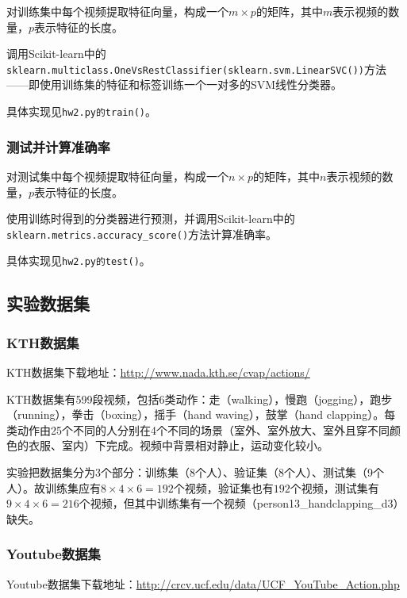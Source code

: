 \documentclass[a4paper, 12pt, UTF8]{article}
\begin{document}
对训练集中每个视频提取特征向量，构成一个$m \times p$的矩阵，其中$m$表示视频的数量，$p$表示特征的长度。

调用Scikit-learn中的\lstinline[language=Python]{sklearn.multiclass.OneVsRestClassifier(sklearn.svm.LinearSVC())}方法\textsuperscript{\cite{ref3} \cite{ref4}}——即使用训练集的特征和标签训练一个一对多的SVM线性分类器。

具体实现见\lstinline{hw2.py的train()}。

\subsubsection{测试并计算准确率}

对测试集中每个视频提取特征向量，构成一个$n \times p$的矩阵，其中$n$表示视频的数量，$p$表示特征的长度。

使用训练时得到的分类器进行预测，并调用Scikit-learn中的\lstinline[language=Python]{sklearn.metrics.accuracy_score()}方法\textsuperscript{\cite{ref5}}计算准确率。

具体实现见\lstinline{hw2.py的test()}。


\subsection{实验数据集}

\subsubsection{KTH数据集}

KTH数据集下载地址：\url{http://www.nada.kth.se/cvap/actions/}

KTH数据集有599段视频，包括6类动作：走（walking），慢跑（jogging），跑步（running），拳击（boxing），摇手（hand waving），鼓掌（hand clapping）。每类动作由25个不同的人分别在4个不同的场景（室外、室外放大、室外且穿不同颜色的衣服、室内）下完成。视频中背景相对静止，运动变化较小。

实验把数据集分为3个部分：训练集（8个人）、验证集（8个人）、测试集（9个人）。故训练集应有$8 \times 4 \times 6 = 192$个视频，验证集也有$192$个视频，测试集有$9 \times 4 \times 6 = 216$个视频，但其中训练集有一个视频（person13\_handclapping\_d3）缺失。

\subsubsection{Youtube数据集}

Youtube数据集下载地址：\url{http://crcv.ucf.edu/data/UCF_YouTube_Action.php}
\end{document}
